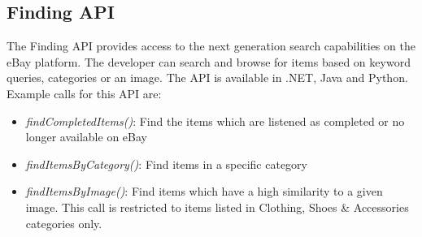 \subsection{Finding API}
The Finding API provides access to the next generation search capabilities on the eBay platform. The developer can search and browse for items based on keyword queries, categories or an image. The API is available in .NET, Java and Python. Example calls for this API are:
\begin{itemize}
	\item \textit{findCompletedItems()}: Find the items which are listened as completed or no longer available on eBay
	\item \textit{findItemsByCategory()}: Find items in a specific category
	\item \textit{findItemsByImage()}: Find items which have a high similarity to a given image. This call is restricted to items listed in Clothing, Shoes \& Accessories categories only.
\end{itemize}

